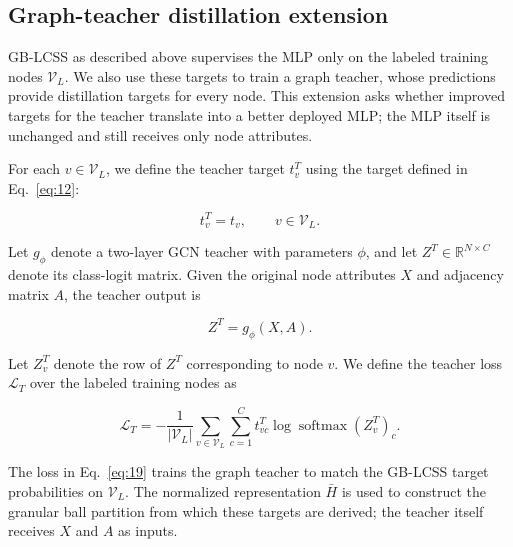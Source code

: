 \documentclass[10pt,letterpaper,nopreprintline]{elsarticle}
\theoremstyle{plain}
\begin{document}
\subsection{Graph-teacher distillation extension}\label{sec:3.5}

GB-LCSS as described above supervises the MLP only on the labeled training nodes \(\mathcal{V}_{L}\). We also use these targets to train a graph teacher, whose predictions provide distillation targets for every node. This extension asks whether improved targets for the teacher translate into a better deployed MLP; the MLP itself is unchanged and still receives only node attributes.

\Needspace{64pt}

For each \(v \in \mathcal{V}_{L}\), we define the teacher target \(t_{v}^{T}\) using the target defined in Eq.~\eqref{eq:12}:

\begin{equation}\label{eq:17}
t_{v}^{T} = t_{v},\qquad v \in \mathcal{V}_{L}.
\end{equation}

\Needspace{64pt}

Let \(g_{\phi}\) denote a two-layer GCN teacher with parameters \(\phi\), and let \(Z^{T} \in \mathbb{R}^{N \times C}\) denote its class-logit matrix. Given the original node attributes \(X\) and adjacency matrix \(A\), the teacher output is

\begin{equation}\label{eq:18}
Z^{T} = g_{\phi}(X,A).
\end{equation}

\Needspace{64pt}

Let \(Z_{v}^{T}\) denote the row of \(Z^{T}\) corresponding to node \(v\). We define the teacher loss \(\mathcal{L}_{T}\) over the labeled training nodes as

\begin{equation}\label{eq:19}
\mathcal{L}_{T} = - \frac{1}{|\mathcal{V}_{L}|}\sum_{v \in \mathcal{V}_{L}}{\sum_{c = 1}^{C}t_{vc}^{T}}\log\operatorname{softmax}\left( Z_{v}^{T} \right)_{c}.
\end{equation}

The loss in Eq.~\eqref{eq:19} trains the graph teacher to match the GB-LCSS target probabilities on \(\mathcal{V}_{L}\). The normalized representation \(\bar{H}\) is used to construct the granular ball partition from which these targets are derived; the teacher itself receives \(X\) and \(A\) as inputs.

\Needspace{64pt}
\end{document}
